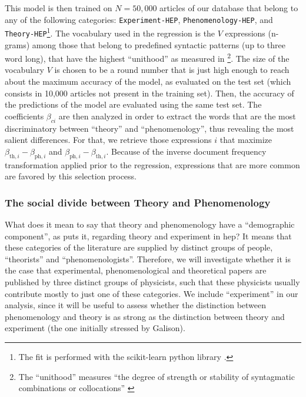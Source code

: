 \documentclass[smallextended]{svjour3}
\begin{document}
This model is then trained on $N=50,000$ articles of our database that belong to any of the following categories: \texttt{Experiment-HEP}, \texttt{Phenomenology-HEP}, and \texttt{Theory-HEP}\footnote{The fit is performed with the scikit-learn python library \citep{scikit-learn}.}. The vocabulary used in the regression is the $V$ expressions (n-grams) among those that belong to predefined syntactic patterns (up to three word long), that have the highest ``unithood'' as measured in \citealt{omodei_tel-01097702}\footnote{The ``unithood'' measures ``the degree of strength or stability of syntagmatic combinations or collocations'' \citep{Kageura1996}}. The size of the vocabulary $V$ is chosen to be a round number that is just high enough to reach about the maximum accuracy of the model, as evaluated on the test set (which consists in 10,000 articles not present in the training set). Then, the accuracy of the predictions of the model are evaluated using the same test set. The coefficients $\beta_{ci}$ are then analyzed in order to extract the words that are the most discriminatory between ``theory'' and ``phenomenology'', thus revealing the most salient differences. For that, we retrieve those expressions $i$ that maximize $\beta_{\text{th},i}-\beta_{\text{ph},i}$ and $\beta_{\text{ph},i}-\beta_{\text{th},i}$. Because of the inverse document frequency transformation applied prior to the regression, expressions that are more common are favored by this selection process.

\subsubsection{The social divide between Theory and Phenomenology}

What does it mean to say that theory and phenomenology have a ``demographic component'', as  \citet[p.~138]{galison1987how} puts it, regarding theory and experiment in \gls{hep}? It means that these categories of the literature are supplied by distinct groups of people, ``theorists'' and ``phenomenologists''. Therefore, we will investigate whether it is the case that experimental, phenomenological and theoretical papers are published by three distinct groups of physicists, such that these physicists usually contribute mostly to just one of these categories. We include ``experiment'' in our analysis, since it will be useful to assess whether the distinction between phenomenology and theory is as strong as the distinction between theory and experiment (the one initially stressed by Galison).
\end{document}
